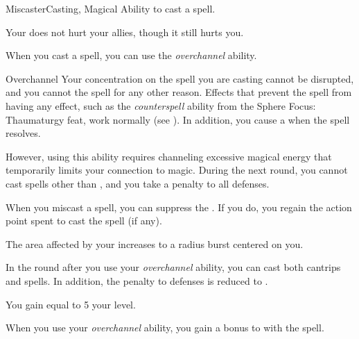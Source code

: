     \begin{feat}{Miscaster}{Casting, Magical}
        \featpre Ability to cast a spell.

         Your  does not hurt your allies, though it still hurts you.

         When you cast a spell, you can use the \textit{overchannel} ability.
        \begin{ability}{Overchannel}
            Your concentration on the spell you are casting cannot be disrupted, and you cannot  the spell for any other reason.
            Effects that prevent the spell from having any effect, such as the \textit{counterspell} ability from the Sphere Focus: Thaumaturgy feat, work normally (see ).
            In addition, you cause a  when the spell resolves.

            However, using this ability requires channeling excessive magical energy that temporarily limits your connection to magic.
            During the next round, you cannot cast spells other than , and you take a  penalty to all defenses.
        \end{ability}

         When you miscast a spell, you can suppress the .
        If you do, you regain the action point spent to cast the spell (if any).

         The area affected by your  increases to a \areamed radius burst centered on you.

         In the round after you use your \textit{overchannel} ability, you can cast both cantrips and spells.
        In addition, the penalty to defenses is reduced to .

         You gain  equal to 5 \add your level.

         When you use your \textit{overchannel} ability, you gain a  bonus to  with the spell.
    \end{feat}

